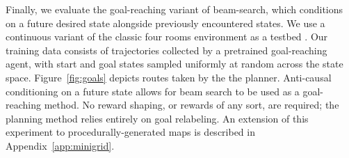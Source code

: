Finally, we evaluate the goal-reaching variant of beam-search, which conditions on a future desired state alongside previously encountered states.
We use a continuous variant of the classic four rooms environment as a testbed \citep{sutton1999semimdps}.
Our training data consists of trajectories collected by a pretrained goal-reaching agent, with start and goal states sampled uniformly at random across the state space.
Figure~\ref{fig:goals} depicts routes taken by the the planner.
Anti-causal conditioning on a future state allows for beam search to be used as a goal-reaching method.
No reward shaping, or rewards of any sort, are required; the planning method relies entirely on goal relabeling.
An extension of this experiment to procedurally-generated maps is described in Appendix~\ref{app:minigrid}.



